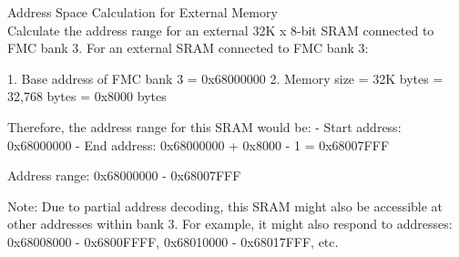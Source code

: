 \begin{example2}{Address Space Calculation for External Memory}\\
Calculate the address range for an external 32K x 8-bit SRAM connected to FMC bank 3.
\tcblower
For an external SRAM connected to FMC bank 3:

1. Base address of FMC bank 3 = 0x68000000
2. Memory size = 32K bytes = 32,768 bytes = 0x8000 bytes

Therefore, the address range for this SRAM would be:
- Start address: 0x68000000
- End address: 0x68000000 + 0x8000 - 1 = 0x68007FFF

Address range: 0x68000000 - 0x68007FFF

Note: Due to partial address decoding, this SRAM might also be accessible at other addresses within bank 3. For example, it might also respond to addresses:
0x68008000 - 0x6800FFFF, 0x68010000 - 0x68017FFF, etc.
\end{example2}